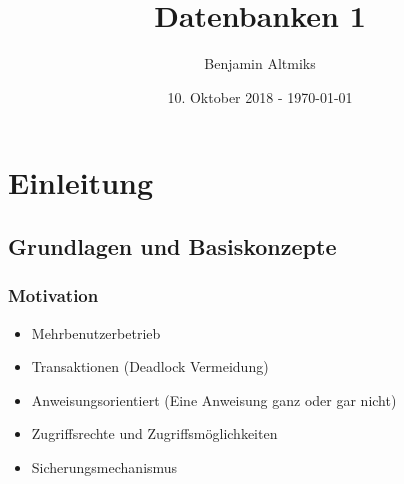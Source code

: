 \documentclass[a4paper,10pt]{scrartcl}
\title{Datenbanken 1}
\author{Benjamin Altmiks}
\date{10. Oktober 2018 - \today}
\begin{document}
\maketitle
\tableofcontents
\newpage
\section{Einleitung}
\subsection{Grundlagen und Basiskonzepte}
\subsubsection{Motivation}

\begin{itemize}
    \item Mehrbenutzerbetrieb
    \item Transaktionen (Deadlock Vermeidung) 
    \item Anweisungsorientiert (Eine Anweisung ganz oder gar nicht)
    \item Zugriffsrechte und Zugriffsmöglichkeiten
    \item Sicherungsmechanismus
\end{itemize}
\end{document}
